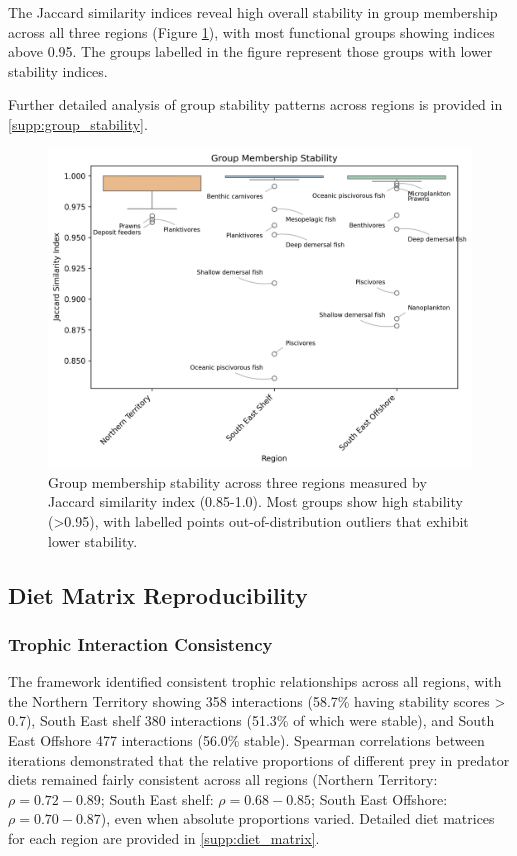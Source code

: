 The Jaccard similarity indices reveal high overall stability in group membership across all three regions (Figure \ref{fig:regional_analysis}), with most functional groups showing indices above 0.95. The groups labelled in the figure represent those groups with lower stability indices.

Further detailed analysis of group stability patterns across regions is provided in \ref{supp:group_stability}.

\begin{figure}[htbp]
    \centering
    \includegraphics[width=\textwidth]{figures/regional_group_analysis.png}
    \caption{Group membership stability across three regions measured by Jaccard similarity index (0.85-1.0). Most groups show high stability (>0.95), with labelled points out-of-distribution outliers that exhibit lower stability.}
    \label{fig:regional_analysis}
\end{figure}



\subsection{Diet Matrix Reproducibility}

\subsubsection{Trophic Interaction Consistency}
The framework identified consistent trophic relationships across all regions, with the Northern Territory showing 358 interactions (58.7\% having stability scores > 0.7), South East shelf 380 interactions (51.3\% of which were stable), and South East Offshore 477 interactions (56.0\% stable). Spearman correlations between iterations demonstrated that the relative proportions of different prey in predator diets remained fairly consistent across all regions (Northern Territory: $\rho = 0.72-0.89$; South East shelf: $\rho = 0.68-0.85$; South East Offshore: $\rho = 0.70-0.87$), even when absolute proportions varied. Detailed diet matrices for each region are provided in \ref{supp:diet_matrix}.

